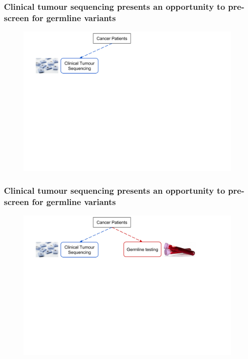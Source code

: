 \documentclass{beamer}
\begin{document}
\begin{frame}
\frametitle{Clinical tumour sequencing presents an opportunity to pre-screen for germline variants}
\vspace{-6mm}
\begin{figure}[t]
    \includegraphics[scale=0.2]{opportunity_clinical_sequencing1a.png}
\end{figure}
\end{frame}

\begin{frame}
\frametitle{Clinical tumour sequencing presents an opportunity to pre-screen for germline variants}
\vspace{-6mm}
\begin{figure}[t]
    \includegraphics[scale=0.2]{opportunity_clinical_sequencing2a.png}
\end{figure}
\end{frame}
\end{document}
